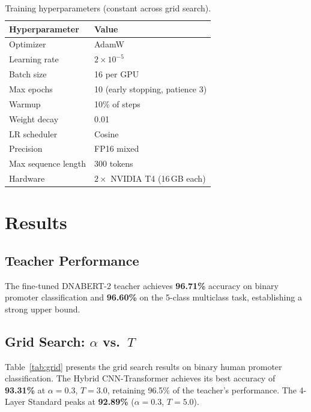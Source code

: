 \documentclass[conference]{IEEEtran}
\begin{document}
\begin{table}[t]
\centering
\caption{Training hyperparameters (constant across grid search).}
\label{tab:training}
\begin{tabular}{ll}
\toprule
\textbf{Hyperparameter} & \textbf{Value} \\
\midrule
Optimizer & AdamW \\
Learning rate & $2 \times 10^{-5}$ \\
Batch size & 16 per GPU \\
Max epochs & 10 (early stopping, patience 3) \\
Warmup & 10\% of steps \\
Weight decay & 0.01 \\
LR scheduler & Cosine \\
Precision & FP16 mixed \\
Max sequence length & 300 tokens \\
Hardware & $2\times$ NVIDIA T4 (16\,GB each) \\
\bottomrule
\end{tabular}
\end{table}

\section{Results}
\label{sec:results}

\subsection{Teacher Performance}

The fine-tuned DNABERT-2 teacher achieves \textbf{96.71\%} accuracy on binary promoter classification and \textbf{96.60\%} on the 5-class multiclass task, establishing a strong upper bound.

\subsection{Grid Search: $\alpha$ vs.\ $T$}

Table~\ref{tab:grid} presents the grid search results on binary human promoter classification. The Hybrid CNN-Transformer achieves its best accuracy of \textbf{93.31\%} at $\alpha\!=\!0.3$, $T\!=\!3.0$, retaining 96.5\% of the teacher's performance. The 4-Layer Standard peaks at \textbf{92.89\%} ($\alpha\!=\!0.3$, $T\!=\!5.0$).
\end{document}
